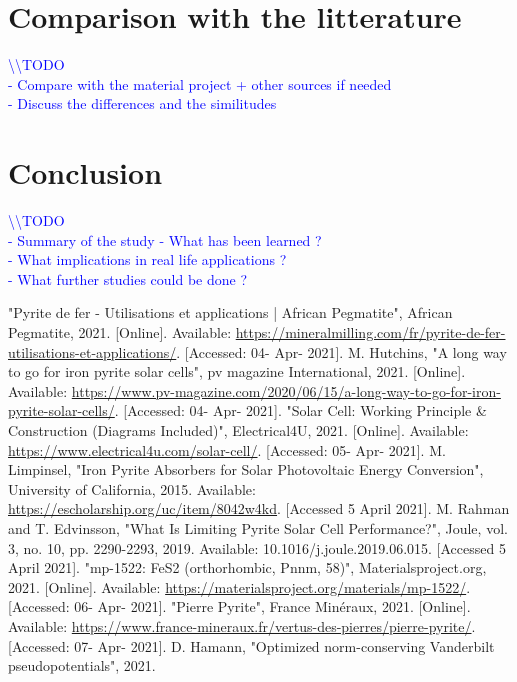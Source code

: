 \documentclass[11pt,a4paper]{article}
\begin{document}
\section{Comparison with the litterature}
\textcolor{blue}{
\textbackslash\textbackslash TODO\\
- Compare with the material project + other sources if needed\\
- Discuss the differences and the similitudes}
\newpage
\section{Conclusion}
\textcolor{blue}{
\textbackslash\textbackslash TODO\\
- Summary of the study
- What has been learned ? \\
- What implications in real life applications ?\\
- What further studies could be done ?}
\newpage
\begin{thebibliography}{00}
 "Pyrite de fer - Utilisations et applications | African Pegmatite", African Pegmatite, 2021. [Online]. Available: \url{https://mineralmilling.com/fr/pyrite-de-fer-utilisations-et-applications/}. [Accessed: 04- Apr- 2021].
 M. Hutchins, "A long way to go for iron pyrite solar cells", pv magazine International, 2021. [Online]. Available: \url{https://www.pv-magazine.com/2020/06/15/a-long-way-to-go-for-iron-pyrite-solar-cells/}. [Accessed: 04- Apr- 2021].
 "Solar Cell: Working Principle \& Construction (Diagrams Included)", Electrical4U, 2021. [Online]. Available: \url{https://www.electrical4u.com/solar-cell/}. [Accessed: 05- Apr- 2021].
 M. Limpinsel, "Iron Pyrite Absorbers for Solar Photovoltaic Energy Conversion", University of California, 2015. Available: \url{https://escholarship.org/uc/item/8042w4kd}. [Accessed 5 April 2021].
 M. Rahman and T. Edvinsson, "What Is Limiting Pyrite Solar Cell Performance?", Joule, vol. 3, no. 10, pp. 2290-2293, 2019. Available: 10.1016/j.joule.2019.06.015. [Accessed 5 April 2021].
 "mp-1522: FeS2 (orthorhombic, Pnnm, 58)", Materialsproject.org, 2021. [Online]. Available: \url{https://materialsproject.org/materials/mp-1522/}. [Accessed: 06- Apr- 2021].
"Pierre Pyrite", France Minéraux, 2021. [Online]. Available: \url{https://www.france-mineraux.fr/vertus-des-pierres/pierre-pyrite/}. [Accessed: 07- Apr- 2021].
 D. Hamann, "Optimized norm-conserving Vanderbilt pseudopotentials", 2021.
\end{thebibliography}
\newpage
\end{document}
